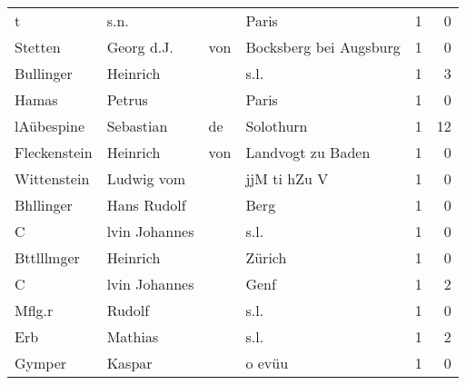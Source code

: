 \begin{tabular}{llllrr}
                        t &                               s.n. &             &                                       Paris &          1 &         0 \\
                  Stetten &                         Georg d.J. &         von &                      Bocksberg bei Augsburg &          1 &         0 \\
                Bullinger &                           Heinrich &             &                                        s.l. &          1 &         3 \\
                    Hamas &                             Petrus &             &                                       Paris &          1 &         0 \\
               lAübespine &                          Sebastian &          de &                                   Solothurn &          1 &        12 \\
             Fleckenstein &                           Heinrich &         von &                           Landvogt zu Baden &          1 &         0 \\
              Wittenstein &                         Ludwig vom &             &                                jjM ti hZu V &          1 &         0 \\
                Bhllinger &                        Hans Rudolf &             &                                        Berg &          1 &         0 \\
                        C &                      lvin Johannes &             &                                        s.l. &          1 &         0 \\
               Bttlllmger &                           Heinrich &             &                                      Zürich &          1 &         0 \\
                        C &                      lvin Johannes &             &                                        Genf &          1 &         2 \\
                   Mflg.r &                             Rudolf &             &                                        s.l. &          1 &         0 \\
                      Erb &                            Mathias &             &                                        s.l. &          1 &         2 \\
                   Gymper &                             Kaspar &             &                                      o evüu &          1 &         0 \\

\end{tabular}
